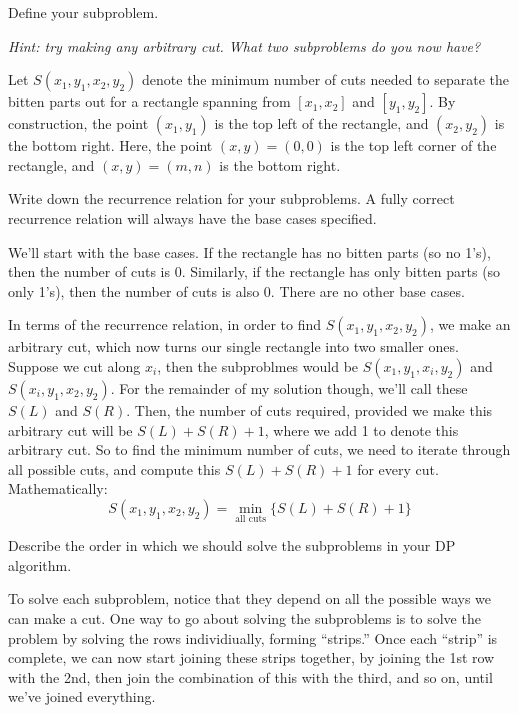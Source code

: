 \documentclass[11pt]{article}
\begin{document}
\begin{subparts}
    \subpart Define your subproblem.

    \emph{Hint: try making any arbitrary cut. What two subproblems do you now have?}

	\begin{solution}
		Let $S(x_1, y_1, x_2, y_2)$ denote the minimum number of cuts needed to separate the bitten 
		parts out for a rectangle spanning from $[x_1, x_2]$ and $[y_1, y_2]$. By construction, the point 
		$(x_1, y_1)$ is the top left of the rectangle, and $(x_2, y_2)$ is the bottom right. Here, the point 
		$(x, y) = (0, 0)$ is the top left corner of the rectangle, and $(x,y) = (m, n)$ is the bottom right.
	\end{solution}

    \subpart Write down the recurrence relation for your subproblems. A fully correct recurrence relation will always have the base cases specified.

	\begin{solution}
		We'll start with the base cases. If the rectangle has no bitten parts (so no 1's), then the number of cuts is 0. 
		Similarly, if the rectangle has only bitten parts (so only 1's), then the number of cuts is also 0. There 
		are no other base cases.

		In terms of the recurrence relation, in order to find $S(x_1,y_1, x_2, y_2)$, we make an arbitrary cut, 
		which now turns our single rectangle into two smaller ones. Suppose we cut along $x_i$, then 
		the subproblmes would be $S(x_1, y_1, x_i, y_2)$ and $S(x_i, y_1, x_2, y_2)$. 
		For the remainder of my solution though, we'll call these $S(L)$ and $S(R)$.
		Then, the number of cuts required, provided we make this 
		arbitrary cut will be $S(L) + S(R) + 1$, where we add 1 to denote this arbitrary cut. So to find the 
		minimum number of cuts, we need to iterate through all possible cuts, and compute this $S(L) + S(R) +1$ 
		for every cut. Mathematically:
		\[
			S(x_1, y_1, x_2, y_2) = \min_{\text{all cuts}} \{ S(L) + S(R) + 1\}
		\]
	\end{solution}
    \subpart Describe the order in which we should solve the subproblems in your DP algorithm.

	\begin{solution}
		To solve each subproblem, notice that they depend on all the possible ways we can make a cut. One 
		way to go about solving the subproblems is to solve the problem by solving the rows individiually, 
		forming ``strips.''
		Once each ``strip'' is complete, we can now start joining these strips 
		together, by joining the 1st row with the 2nd, then join the combination of this with the third, 
		and so on, until we've joined everything.  


\end{solution}
\end{subparts}
\end{document}
